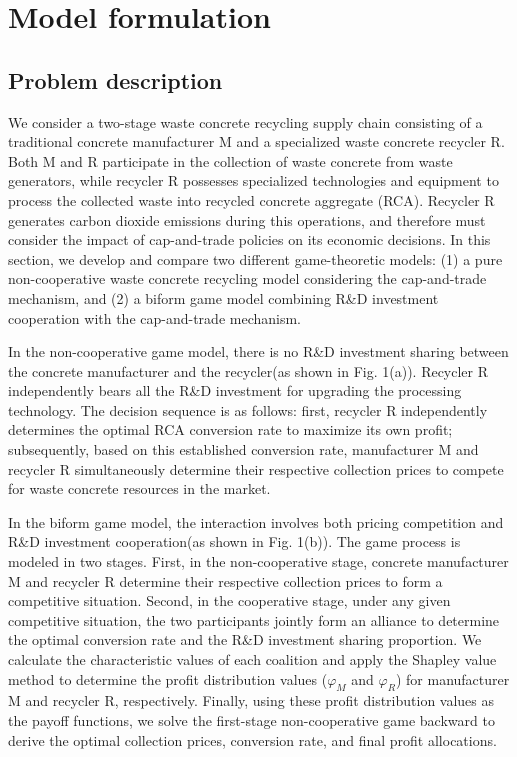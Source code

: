\documentclass[authoryear,preprint,review,times,10pt]{elsarticle}
\begin{document}
\section{Model formulation}
\subsection{Problem description}
We consider a two-stage waste concrete recycling supply chain consisting of a traditional concrete manufacturer M and a specialized waste concrete recycler R. Both M and R participate in the collection of waste concrete from waste generators, while recycler R possesses specialized technologies and equipment to process the collected waste into recycled concrete aggregate (RCA). Recycler R generates carbon dioxide emissions during this operations, and therefore must consider the impact of cap-and-trade policies on its economic decisions. In this section, we develop and compare two different game-theoretic models: (1) a pure non-cooperative waste concrete recycling model considering the cap-and-trade mechanism, and (2) a biform game model combining R\&D investment cooperation with the cap-and-trade mechanism.

In the non-cooperative game model, there is no R\&D investment sharing between the concrete manufacturer and the recycler(as shown in Fig. 1(a)). Recycler R independently bears all the R\&D investment for upgrading the processing technology. The decision sequence is as follows: first, recycler R independently determines the optimal RCA conversion rate to maximize its own profit; subsequently, based on this established conversion rate, manufacturer M and recycler R simultaneously determine their respective collection prices to compete for waste concrete resources in the market.

In the biform game model, the interaction involves both pricing competition and R\&D investment cooperation(as shown in Fig. 1(b)). The game process is modeled in two stages. First, in the non-cooperative stage, concrete manufacturer M and recycler R determine their respective collection prices to form a competitive situation. Second, in the cooperative stage, under any given competitive situation, the two participants jointly form an alliance to determine the optimal conversion rate and the R\&D investment sharing proportion. We calculate the characteristic values of each coalition and apply the Shapley value method to determine the profit distribution values ($\varphi_M$ and $\varphi_R$) for manufacturer M and recycler R, respectively. Finally, using these profit distribution values as the payoff functions, we solve the first-stage non-cooperative game backward to derive the optimal collection prices, conversion rate, and final profit allocations.
\end{document}
